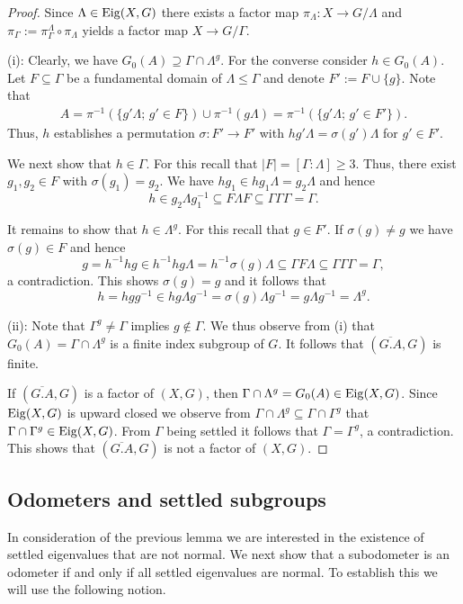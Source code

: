 \documentclass[12pt, reqno]{amsart}
\theoremstyle{definition}
\theoremstyle{remark}
\numberwithin{equation}{section}
\theoremstyle{theorem}
\theoremstyle{remark}
\def\Eig{{\rm Eig}}
\begin{document}
\begin{proof}
    Since $\Lambda\in \Eig(X,G)$ there exists a factor map $\pi_\Lambda\colon X\to G/\Lambda$ and $\pi_\Gamma:=\pi^\Lambda_\Gamma\circ \pi_\Lambda$ yields a factor map $X\to G/\Gamma$. 

(i):
    Clearly, we have $G_0(A)\supseteq \Gamma\cap \Lambda^g$. 
    For the converse consider $h\in G_0(A)$. 
    Let $F\subseteq \Gamma$ be a fundamental domain of $\Lambda\leq \Gamma$ and denote
    $F':=F\cup \{g\}$.
    Note that
    \begin{align*}
        A
        =\pi^{-1}(\{g'\Lambda;\, g'\in F\}) \cup \pi^{-1}(g\Lambda)
        =\pi^{-1}\left(\{g'\Lambda;\, g'\in F'\}\right). 
    \end{align*}
    Thus, $h$ establishes a permutation $\sigma\colon F'\to F'$ with 
    $hg'\Lambda=\sigma(g')\Lambda$ for $g'\in F'$. 

    We next show that $h\in \Gamma$. 
    For this recall that $|F|=[\Gamma\colon \Lambda]\geq 3$.    
    Thus, there exist $g_1,g_2\in F$ with $\sigma(g_1)=g_2$. 
    We have $hg_1\in hg_1\Lambda = g_2\Lambda$ and hence 
    \[h\in g_2\Lambda g_1^{-1}\subseteq F\Lambda F\subseteq\Gamma\Gamma\Gamma=\Gamma.\] 

    It remains to show that $h\in \Lambda^g$. 
    For this recall that $g\in F'$. 
    If $\sigma(g)\neq g$ we have $\sigma(g)\in F$ and hence 
    \[g
    =h^{-1}hg\in h^{-1}hg\Lambda
    =h^{-1}\sigma(g)\Lambda
    \subseteq \Gamma F \Lambda
    \subseteq \Gamma\Gamma\Gamma=\Gamma,\]
    a contradiction. 
    This shows $\sigma(g)=g$ and it follows that
    \[h=hgg^{-1}\in hg\Lambda g^{-1}=\sigma(g)\Lambda g^{-1}=g\Lambda g^{-1}=\Lambda^g.\]

(ii):
    Note that $\Gamma^g\neq \Gamma$ implies $g\notin \Gamma$. 
    We thus observe from (i) that $G_0(A)=\Gamma\cap \Lambda^g$ is a finite index subgroup of $G$. 
    It follows that $(\overline{G.A},G)$ is finite. 

    If $(\overline{G.A},G)$ is a factor of $(X,G)$, then 
    $\Gamma\cap \Lambda^g=G_0(A)\in \Eig(X,G)$. 
    Since $\Eig(X,G)$ is upward closed we observe from 
    $\Gamma\cap \Lambda^g\subseteq \Gamma\cap \Gamma^g$ that 
    $\Gamma\cap \Gamma^g\in \Eig(X,G)$.
    From $\Gamma$ being settled it follows that $\Gamma=\Gamma^g$, a contradiction. 
    This shows that $(\overline{G.A},G)$ is not a factor of $(X,G)$. 
\end{proof}



\subsection{Odometers and settled subgroups}
\label{subsec:hyperspacesOfSubodometers_OdometersAndSettledSubgroups}
In consideration of the previous lemma we are interested in the existence of settled eigenvalues that are not normal. We next show that a subodometer is an odometer if and only if all settled eigenvalues are normal. 
To establish this we will use the following notion. 
\end{document}
